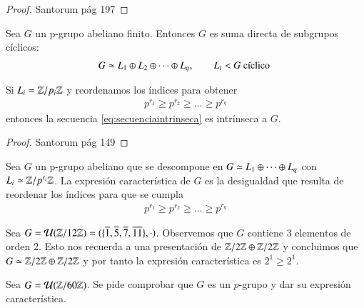 \begin{proof}
	Santorum pág 197 %
\end{proof}

\begin{pro}
	Sea $G$ un p-grupo abeliano finito. Entonces $G$ es suma directa de subgrupos cíclicos:
	\begin{align}
		G \simeq L_1 \oplus L_2 \oplus \dots \oplus L_q,\qquad L_i < G\text{ cíclico }
	\end{align}
\end{pro}

\begin{cor}
	Si $L_i = \mathbb{Z}/p_i\mathbb{Z}$ y reordenamos los índices para obtener
	\begin{align}
		\label{eq:secuenciaintrinseca}
		p^{r_1} \geq p^{r_2} \geq \dots \geq p^{r_q}
	\end{align}
	entonces la secuencia \ref{eq:secuenciaintrinseca} es intrínseca a $G$.
\end{cor}

\begin{proof}
	Santorum pág 149
\end{proof}

\begin{dfn}
	Sea $G$ un p-grupo abeliano que se descompone en $G \simeq L_1 \oplus \dots \oplus L_q$ con $L_i \simeq \mathbb{Z}/p^{r_i}\mathbb{Z}$. La expresión característica de $G$ es la desigualdad que resulta de reordenar los índices para que se cumpla
	\begin{align}
		\label{eq:eqcaracteristica}
		p^{r_1} \geq p^{r_2} \geq \dots \geq p^{r_q}
	\end{align}
\end{dfn}

\begin{ej}
	Sea $G = \mathcal{U}(\mathbb{Z}/12\mathbb{Z}) = (\{\overline{1}, \overline{5}, \overline{7}, \overline{11}\}, \cdot)$. Observemos que $G$ contiene 3 elementos de orden 2. Esto nos recuerda a una presentación de $\mathbb{Z}/2\mathbb{Z} \oplus \mathbb{Z}/2\mathbb{Z}$ y concluimos que $G \simeq \mathbb{Z}/2\mathbb{Z} \oplus \mathbb{Z}/2\mathbb{Z}$ y por tanto la expresión característica es $2^1 \geq 2^1$.
\end{ej}

\begin{ej}
	Sea $G = \mathcal{U}(\mathbb{Z}/60\mathbb{Z})$. Se pide comprobar que $G$ es un $p$-grupo y dar su expresión característica.
\end{ej}


